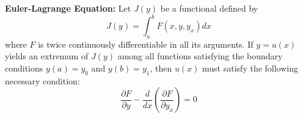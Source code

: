 \documentclass[../main.tex]{subfiles}
\begin{document}
\begin{yellow}
\begin{theorem}
    
\textbf{Euler-Lagrange Equation:}
Let $J(y)$ be a functional defined by
$$
J(y) = \int_{a}^{b} F(x, y, y_x)  dx
$$
where $F$ is twice continuously differentiable in all its arguments. If $y = u(x)$ yields an extremum of $J(y)$ among all functions satisfying the boundary conditions $y(a) = y_0$ and $y(b) = y_1$, then $u(x)$ must satisfy the following necessary condition:
\begin{equation*}
\frac{\partial F}{\partial y} - \frac{d}{dx}\left(\frac{\partial F}{\partial y_x}\right) = 0
\end{equation*}

\end{theorem}
\end{yellow}
\end{document}
